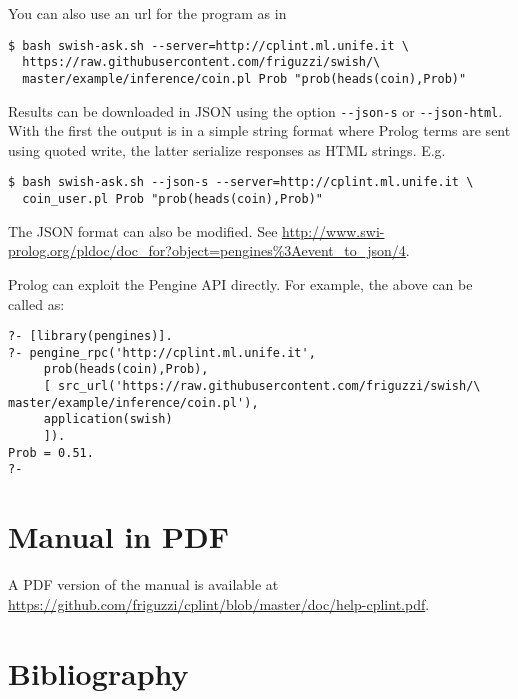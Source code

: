 \documentclass[a4paper,10pt]{scrartcl}
\begin{document}
You can also use an url for the program as in 
\begin{verbatim}
$ bash swish-ask.sh --server=http://cplint.ml.unife.it \
  https://raw.githubusercontent.com/friguzzi/swish/\  
  master/example/inference/coin.pl Prob "prob(heads(coin),Prob)"
\end{verbatim}
Results can be downloaded in JSON using the option \verb|--json-s| or
\verb|--json-html|.
With the first the output is in a simple string format where Prolog terms are sent using quoted write, the latter serialize responses as HTML strings. E.g.
\begin{verbatim}
$ bash swish-ask.sh --json-s --server=http://cplint.ml.unife.it \
  coin_user.pl Prob "prob(heads(coin),Prob)"
\end{verbatim}
The JSON format can also be modified. See
\url{http://www.swi-prolog.org/pldoc/doc_for?object=pengines%3Aevent_to_json/4}.

Prolog can exploit the Pengine API directly.  For example, the above can
be called as:
\begin{verbatim}
?- [library(pengines)].
?- pengine_rpc('http://cplint.ml.unife.it',
     prob(heads(coin),Prob),
     [ src_url('https://raw.githubusercontent.com/friguzzi/swish/\  
master/example/inference/coin.pl'),
     application(swish)
     ]).
Prob = 0.51.
?-
\end{verbatim}

\section{Manual in PDF}
A PDF version of the manual is available at
\url{https://github.com/friguzzi/cplint/blob/master/doc/help-cplint.pdf}.
\section{Bibliography}


\end{document}

